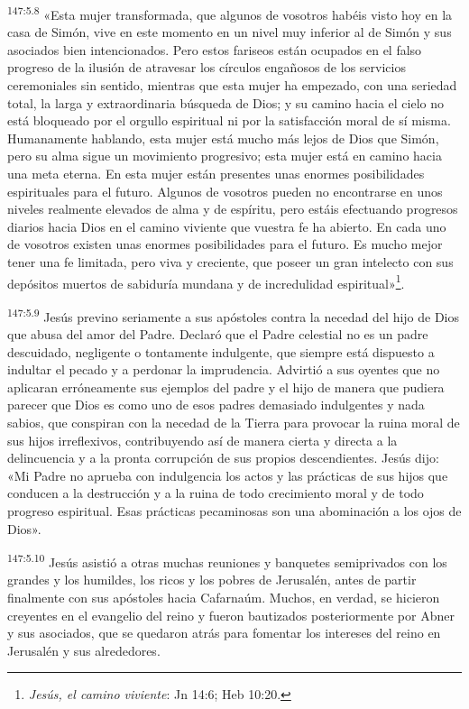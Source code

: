 \par
\textsuperscript{147:5.8} «Esta mujer transformada, que algunos de vosotros habéis visto hoy en la casa de Simón, vive en este momento en un nivel muy inferior al de Simón y sus asociados bien intencionados. Pero estos fariseos están ocupados en el falso progreso de la ilusión de atravesar los círculos engañosos de los servicios ceremoniales sin sentido, mientras que esta mujer ha empezado, con una seriedad total, la larga y extraordinaria búsqueda de Dios; y su camino hacia el cielo no está bloqueado por el orgullo espiritual ni por la satisfacción moral de sí misma. Humanamente hablando, esta mujer está mucho más lejos de Dios que Simón, pero su alma sigue un movimiento progresivo; esta mujer está en camino hacia una meta eterna. En esta mujer están presentes unas enormes posibilidades espirituales para el futuro. Algunos de vosotros pueden no encontrarse en unos niveles realmente elevados de alma y de espíritu, pero estáis efectuando progresos diarios hacia Dios en el camino viviente que vuestra fe ha abierto. En cada uno de vosotros existen unas enormes posibilidades para el futuro. Es mucho mejor tener una fe limitada, pero viva y creciente, que poseer un gran intelecto con sus depósitos muertos de sabiduría mundana y de incredulidad espiritual»\footnote{\textit{Jesús, el camino viviente}: Jn 14:6; Heb 10:20.}.

\par
\textsuperscript{147:5.9} Jesús previno seriamente a sus apóstoles contra la necedad del hijo de Dios que abusa del amor del Padre. Declaró que el Padre celestial no es un padre descuidado, negligente o tontamente indulgente, que siempre está dispuesto a indultar el pecado y a perdonar la imprudencia. Advirtió a sus oyentes que no aplicaran erróneamente sus ejemplos del padre y el hijo de manera que pudiera parecer que Dios es como uno de esos padres demasiado indulgentes y nada sabios, que conspiran con la necedad de la Tierra para provocar la ruina moral de sus hijos irreflexivos, contribuyendo así de manera cierta y directa a la delincuencia y a la pronta corrupción de sus propios descendientes. Jesús dijo: «Mi Padre no aprueba con indulgencia los actos y las prácticas de sus hijos que conducen a la destrucción y a la ruina de todo crecimiento moral y de todo progreso espiritual. Esas prácticas pecaminosas son una abominación a los ojos de Dios».

\par
\textsuperscript{147:5.10} Jesús asistió a otras muchas reuniones y banquetes semiprivados con los grandes y los humildes, los ricos y los pobres de Jerusalén, antes de partir finalmente con sus apóstoles hacia Cafarnaúm. Muchos, en verdad, se hicieron creyentes en el evangelio del reino y fueron bautizados posteriormente por Abner y sus asociados, que se quedaron atrás para fomentar los intereses del reino en Jerusalén y sus alrededores.

